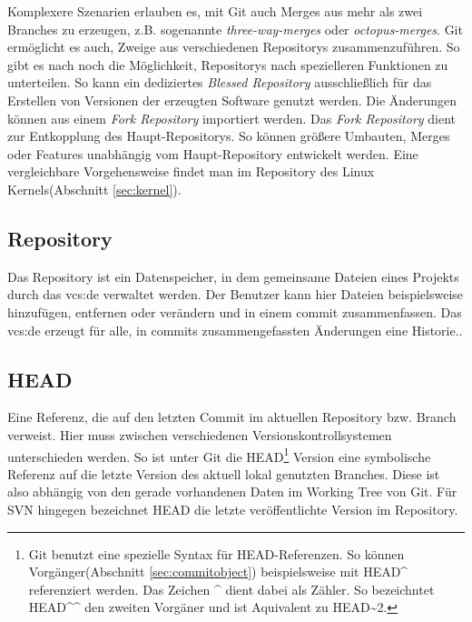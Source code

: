 Komplexere Szenarien erlauben es, mit Git auch Merges aus mehr als zwei
Branches zu erzeugen, z.B. sogenannte \textit{three-way-merges} oder
\textit{octopus-merges}\cite[S.~87]{gitosp}. Git ermöglicht es auch, Zweige aus
verschiedenen Repositorys zusammenzuführen. So gibt es nach \cite[3]{gitwf}
noch die Möglichkeit, Repositorys nach spezielleren Funktionen zu unterteilen.
So kann ein dediziertes \textit{Blessed Repository} ausschließlich für das
Erstellen von Versionen der erzeugten Software genutzt werden. Die Änderungen
können aus einem \textit{Fork Repository} importiert werden. Das \textit{Fork
Repository} dient zur Entkopplung des Haupt-Repositorys. So können größere
Umbauten, Merges oder Features unabhängig vom Haupt-Repository entwickelt
werden\cite[S.~123]{gitwf}. Eine vergleichbare Vorgehensweise findet man im
Repository des Linux Kernels\cite{link:linuxgit}(Abschnitt \ref{sec:kernel}).

\subsection{Repository}\label{sec:repository}
Das Repository ist ein Datenspeicher, in dem gemeinsame Dateien eines Projekts
durch das \acrlong{vcs:de} verwaltet werden. Der Benutzer kann hier Dateien
beispielsweise hinzufügen, entfernen oder verändern und in einem \gls{commit}
zusammenfassen. Das \acrlong{vcs:de} erzeugt für alle, in \glspl{commit}
zusammengefassten Änderungen eine Historie.\cite[S.~38]{hagen:1678}.

\subsection{HEAD}\label{sec:head}
Eine Referenz, die auf den letzten Commit im aktuellen Repository bzw. Branch
verweist. Hier muss zwischen verschiedenen Versionskontrollsystemen
unterschieden werden. So ist unter Git die HEAD\footnote{Git benutzt eine
spezielle Syntax für HEAD-Referenzen. So können Vorgänger(Abschnitt
\ref{sec:commitobject}) beispielsweise mit HEAD\^{} referenziert werden. Das
Zeichen \^{} dient dabei als Zähler. So bezeichntet HEAD\^{}\^{} den zweiten Vorgäner und
ist Aquivalent zu HEAD\~{}2.\cite[S.~65]{gitosp}} Version eine symbolische
Referenz auf die letzte Version des aktuell lokal genutzten Branches. Diese ist
also abhängig von den gerade vorhandenen Daten im Working Tree von
Git\cite[S.~20]{gitosp}. Für SVN hingegen bezeichnet HEAD die letzte
veröffentlichte Version im Repository.

